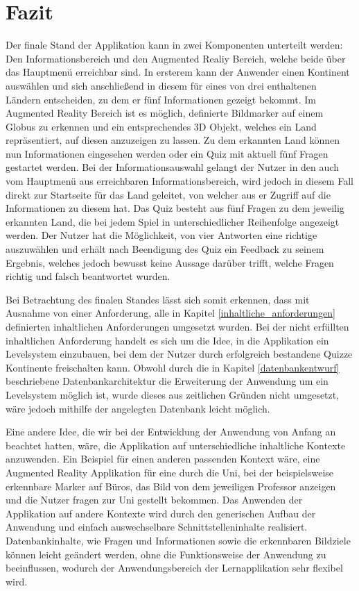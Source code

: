 \chapter{Fazit}\label{ch:fazit}
Der finale Stand der Applikation kann in zwei Komponenten unterteilt werden: Den Informationsbereich und den Augmented Realiy Bereich, welche beide über das Hauptmenü erreichbar sind.
In ersterem kann der Anwender einen Kontinent auswählen und sich anschließend in diesem für eines von drei enthaltenen Ländern entscheiden, zu dem er fünf Informationen gezeigt bekommt.
Im Augmented Reality Bereich ist es möglich, definierte Bildmarker auf einem Globus zu erkennen und ein entsprechendes 3D Objekt, welches ein Land repräsentiert, auf diesen anzuzeigen zu lassen.
Zu dem erkannten Land können nun Informationen eingesehen werden oder ein Quiz mit aktuell fünf Fragen gestartet werden. 
Bei der Informationsauswahl gelangt der Nutzer in den auch vom Hauptmenü aus erreichbaren Informationsbereich, wird jedoch in diesem Fall direkt zur Startseite für das Land geleitet, von welcher aus er Zugriff auf die Informationen zu diesem hat.
Das Quiz besteht aus fünf Fragen zu dem jeweilig erkannten Land, die bei jedem Spiel in unterschiedlicher Reihenfolge angezeigt werden.
Der Nutzer hat die Möglichkeit, von vier Antworten eine richtige auszuwählen und erhält nach Beendigung des Quiz ein Feedback zu seinem Ergebnis, welches jedoch bewusst keine Aussage darüber trifft, welche Fragen richtig und falsch beantwortet wurden.

Bei Betrachtung des finalen Standes lässt sich somit erkennen, dass mit Ausnahme von einer Anforderung, alle in Kapitel \ref{inhaltliche_anforderungen} definierten inhaltlichen Anforderungen umgesetzt wurden.
Bei der nicht erfüllten inhaltlichen Anforderung handelt es sich um die Idee, in die Applikation ein Levelsystem einzubauen, bei dem der Nutzer durch erfolgreich bestandene Quizze Kontinente freischalten kann.
Obwohl durch die in Kapitel \ref{datenbankentwurf} beschriebene Datenbankarchitektur die Erweiterung der Anwendung um ein Levelsystem möglich ist, wurde dieses aus zeitlichen Gründen nicht umgesetzt, wäre jedoch mithilfe der angelegten Datenbank leicht möglich.

Eine andere Idee, die wir bei der Entwicklung der Anwendung von Anfang an beachtet hatten, wäre, die Applikation auf unterschiedliche inhaltliche Kontexte anzuwenden.
Ein Beispiel für einen anderen passenden Kontext wäre, eine Augmented Reality Applikation für eine  durch die Uni, bei der beispielsweise erkennbare Marker auf Büros, das Bild von dem jeweiligen Professor anzeigen und die Nutzer fragen zur Uni gestellt bekommen.
Das Anwenden der Applikation auf andere Kontexte wird durch den generischen Aufbau der Anwendung und einfach auswechselbare Schnittstelleninhalte realisiert.
Datenbankinhalte, wie Fragen und Informationen sowie die erkennbaren Bildziele können leicht geändert werden, ohne die Funktionsweise der Anwendung zu beeinflussen, wodurch der Anwendungsbereich der Lernapplikation sehr flexibel wird.

